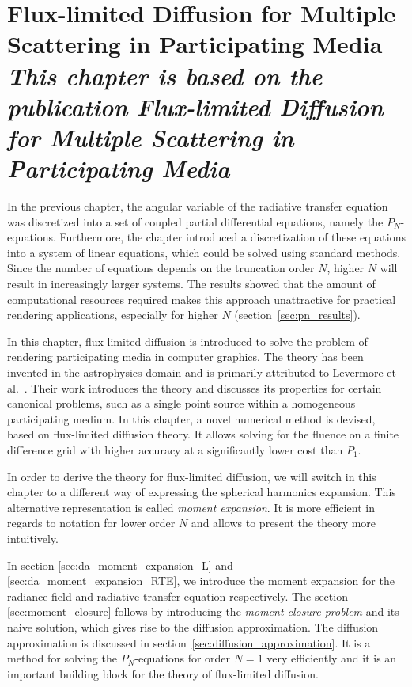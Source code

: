 \chapter[Flux-limited Diffusion for Multiple Scattering in Participating Media]{Flux-limited Diffusion for Multiple Scattering in Participating Media\\[15pt]\normalsize\itshape This chapter is based on the publication Flux-limited Diffusion for Multiple Scattering in\\[-13pt] Participating Media~\cite{Koerner14}}
\label{sec:fld}

In the previous chapter, the angular variable of the radiative transfer equation was discretized into a set of coupled partial differential equations, namely the $P_N$-equations. Furthermore, the chapter introduced a discretization of these equations into a system of linear equations, which could be solved using standard methods. Since the number of equations depends on the truncation order $N$, higher $N$ will result in increasingly larger systems. The results showed that the amount of computational resources required makes this approach unattractive for practical rendering applications, especially for higher $N$ (section~\ref{sec:pn_results}).

In this chapter, flux-limited diffusion is introduced to solve the problem of rendering participating media in computer graphics. The theory has been invented in the astrophysics domain and is primarily attributed to Levermore et al.~\cite{Levermore81}. Their work introduces the theory and discusses its properties for certain canonical problems, such as a single point source within a homogeneous participating medium. In this chapter, a novel numerical method is devised, based on flux-limited diffusion theory. It allows solving for the fluence on a finite difference grid with higher accuracy at a significantly lower cost than $P_1$.

In order to derive the theory for flux-limited diffusion, we will switch in this chapter to a different way of expressing the spherical harmonics expansion. This alternative representation is called \emph{moment expansion}. It is more efficient in regards to notation for lower order $N$ and allows to present the theory more intuitively.

In section \ref{sec:da_moment_expansion_L} and \ref{sec:da_moment_expansion_RTE}, we introduce the moment expansion for the radiance field and radiative transfer equation respectively. The section \ref{sec:moment_closure} follows by introducing the \emph{moment closure problem} and its naive solution, which gives rise to the diffusion approximation. The diffusion approximation is discussed in section~\ref{sec:diffusion_approximation}. It is a method for solving the $P_N$-equations for order $N=1$ very efficiently and it is an important building block for the theory of flux-limited diffusion.

